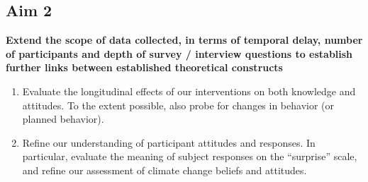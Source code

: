 % 

\subsection{Aim 2}

\textbf{Extend the scope of data collected, in terms of temporal delay, number
    of participants and depth of survey / interview questions to establish
    further links between established theoretical constructs}

\begin{enumerate}
    \item Evaluate the longitudinal effects of our interventions on both
        knowledge and attitudes. To the extent possible, also probe for changes
        in behavior (or planned behavior).
    \item Refine our understanding of participant attitudes and responses. In
        particular, evaluate the meaning of subject responses on the
        ``surprise'' scale, and refine our assessment of climate change beliefs
        and attitudes.
\end{enumerate}

